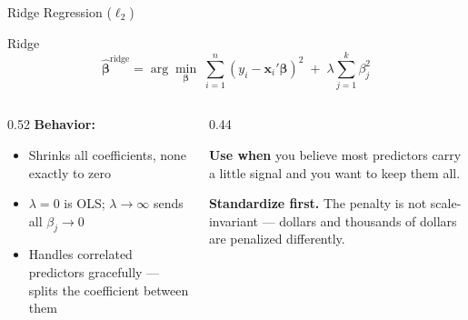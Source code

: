\documentclass[aspectratio=169, 11pt]{beamer}
\begin{document}

\begin{frame}{Ridge Regression ($\ell_2$)}
  \begin{definitionbox}{Ridge \parencite{HoerlKennard1970}}
    \[
      \hat{\boldsymbol{\beta}}^{\text{ridge}}
      = \arg\min_{\boldsymbol{\beta}} \;
        \sum_{i=1}^{n}(y_i - \mathbf{x}_i'\boldsymbol{\beta})^2
        \; + \; \lambda \sum_{j=1}^{k} \beta_j^2
    \]
  \end{definitionbox}
  \begin{columns}[T]
    \begin{column}{0.52\textwidth}
      \textbf{Behavior:}
      \begin{itemize}\small\itemsep0pt
        \item Shrinks all coefficients, none exactly to zero
        \item $\lambda = 0$ is OLS; $\lambda \to \infty$ sends all
              $\beta_j \to 0$
        \item Handles correlated predictors gracefully --- splits the
              coefficient between them
      \end{itemize}
    \end{column}
    \begin{column}{0.44\textwidth}
      \begin{keybox}
        \small \textbf{Use when} you believe most predictors carry
        a little signal and you want to keep them all.
      \end{keybox}
      \vspace{0.1cm}
      \begin{warningbox}
        \footnotesize \textbf{Standardize first.} The penalty is not
        scale-invariant --- dollars and thousands of dollars are penalized
        differently.
      \end{warningbox}
    \end{column}
  \end{columns}
\end{frame}
\end{document}
